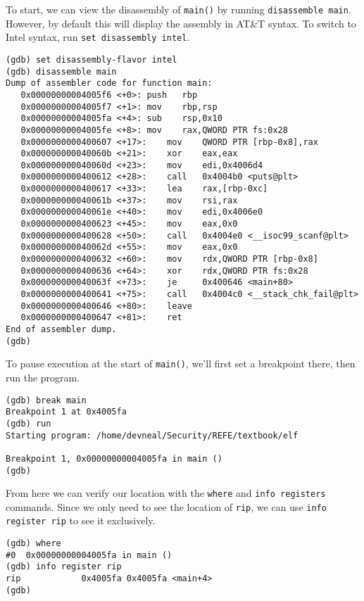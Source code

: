 \documentclass{article}
\begin{document}
To start, we can view the disassembly of \texttt{main()} by running
\texttt{disassemble main}. However, by default this will display the assembly in
AT\&T syntax. To switch to Intel syntax, run \texttt{set disassembly intel}.

\begin{lstlisting}
(gdb) set disassembly-flavor intel
(gdb) disassemble main
Dump of assembler code for function main:
   0x00000000004005f6 <+0>:	push   rbp
   0x00000000004005f7 <+1>:	mov    rbp,rsp
   0x00000000004005fa <+4>:	sub    rsp,0x10
   0x00000000004005fe <+8>:	mov    rax,QWORD PTR fs:0x28
   0x0000000000400607 <+17>:	mov    QWORD PTR [rbp-0x8],rax
   0x000000000040060b <+21>:	xor    eax,eax
   0x000000000040060d <+23>:	mov    edi,0x4006d4
   0x0000000000400612 <+28>:	call   0x4004b0 <puts@plt>
   0x0000000000400617 <+33>:	lea    rax,[rbp-0xc]
   0x000000000040061b <+37>:	mov    rsi,rax
   0x000000000040061e <+40>:	mov    edi,0x4006e0
   0x0000000000400623 <+45>:	mov    eax,0x0
   0x0000000000400628 <+50>:	call   0x4004e0 <__isoc99_scanf@plt>
   0x000000000040062d <+55>:	mov    eax,0x0
   0x0000000000400632 <+60>:	mov    rdx,QWORD PTR [rbp-0x8]
   0x0000000000400636 <+64>:	xor    rdx,QWORD PTR fs:0x28
   0x000000000040063f <+73>:	je     0x400646 <main+80>
   0x0000000000400641 <+75>:	call   0x4004c0 <__stack_chk_fail@plt>
   0x0000000000400646 <+80>:	leave  
   0x0000000000400647 <+81>:	ret    
End of assembler dump.
(gdb) 
\end{lstlisting}

To pause execution at the start of \texttt{main()}, we'll first set a breakpoint
there, then run the program.

\begin{lstlisting}
(gdb) break main
Breakpoint 1 at 0x4005fa
(gdb) run
Starting program: /home/devneal/Security/REFE/textbook/elf 

Breakpoint 1, 0x00000000004005fa in main ()
(gdb) 
\end{lstlisting}

From here we can verify our location with the \texttt{where} and \texttt{info
registers} commands. Since we only need to see the location of \texttt{rip}, we
can use \texttt{info register rip} to see it exclusively.

\begin{lstlisting}
(gdb) where
#0  0x00000000004005fa in main ()
(gdb) info register rip
rip            0x4005fa	0x4005fa <main+4>
(gdb) 
\end{lstlisting}
\end{document}

